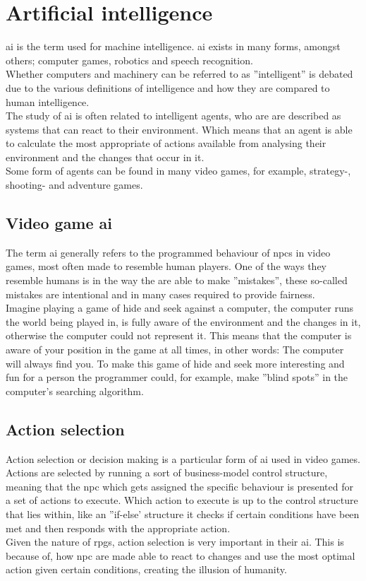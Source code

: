\section{Artificial intelligence}
\ac{ai} is the term used for machine intelligence. \ac{ai} exists in many forms, amongst others; computer games, robotics and speech recognition.\\
Whether computers and machinery can be referred to as ''intelligent'' is debated due to the various definitions of intelligence and how they are compared to human intelligence.\\
The study of \ac{ai} is often related to intelligent agents, who are are described as systems that can react to their environment. Which means that an agent is able to calculate the most appropriate of actions available from analysing their environment and the changes that occur in it.\\
Some form of agents can be found in many video games, for example, strategy-, shooting- and adventure games.\cite{artint}

\subsection{Video game \ac{ai}}
The term \ac{ai} generally refers to the programmed behaviour of \ac{npc}s in video games, most often made to resemble human players. One of the ways they resemble humans is in the way the are able to make ''mistakes'', these so-called mistakes are intentional and in many cases required to provide fairness.\\
Imagine playing a game of hide and seek against a computer, the computer runs the world being played in, is fully aware of the environment and the changes in it, otherwise the computer could not represent it. This means that the computer is aware of your position in the game at all times, in other words: The computer will always find you. To make this game of hide and seek more interesting and fun for a person the programmer could, for example, make ''blind spots'' in the computer's searching algorithm.\cite{videoint}

\subsection{Action selection}
\label{analysis:action}
Action selection or decision making is a particular form of \ac{ai} used in video games. Actions are selected by running a sort of business-model control structure, meaning that the \ac{npc} which gets assigned the specific behaviour is presented for a set of actions to execute. Which action to execute is up to the control structure that lies within, like an ''if-else' structure it checks if certain conditions have been met and then responds with the appropriate action.\cite{actionselect}\\
Given the nature of \ac{rpgs}, action selection is very important in their \ac{ai}. This is because of, how \ac{npc} are made able to react to changes and use the most optimal action given certain conditions, creating the illusion of humanity.
